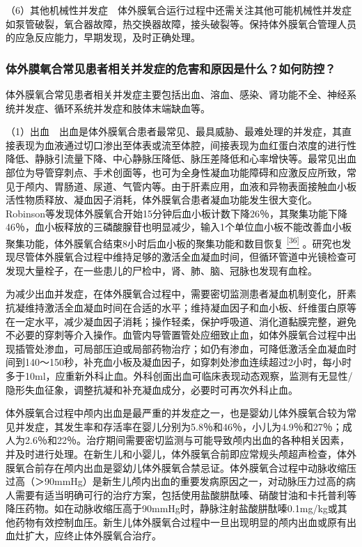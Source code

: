 （6）其他机械性并发症　体外膜氧合运行过程中还需关注其他可能机械性并发症如泵管破裂，氧合器故障，热交换器故障，接头破裂等。保持体外膜氧合管理人员的应急反应能力，早期发现，及时正确处理。

\subsubsection{体外膜氧合常见患者相关并发症的危害和原因是什么？如何防控？}

体外膜氧合常见患者相关并发症主要包括出血、溶血、感染、肾功能不全、神经系统并发症、循环系统并发症和肢体末端缺血等。

（1）出血　出血是体外膜氧合患者最常见、最具威胁、最难处理的并发症，其直接表现为血液通过切口渗出至体表或流至体腔，间接表现为血红蛋白浓度的进行性降低、静脉引流量下降、中心静脉压降低、脉压差降低和心率增快等。最常见出血部位为导管穿刺点、手术创面等，也可为全身性凝血功能障碍和应激反应所致，常见于颅内、胃肠道、尿道、气管内等。由于肝素应用，血液和异物表面接触血小板活性物质释放、凝血因子消耗，体外膜氧合患者凝血功能发生很大变化。Robinson等发现体外膜氧合开始15分钟后血小板计数下降26％，其聚集功能下降46％，血小板释放的三磷酸腺苷也明显减少，输入1个单位血小板不能改善血小板聚集功能，体外膜氧合结束8小时后血小板的聚集功能和数目恢复
\protect\hyperlink{text00030.htmlux5cux23ch36-29}{\textsuperscript{{[}36{]}}}
。研究也发现尽管体外膜氧合过程中维持足够的激活全血凝血时间，但循环管道中光镜检查可发现大量栓子，在一些患儿的尸检中，肾、肺、脑、冠脉也发现有血栓。

为减少出血并发症，在体外膜氧合过程中，需要密切监测患者凝血机制变化，肝素抗凝维持激活全血凝血时间在合适的水平；维持凝血因子和血小板、纤维蛋白原等在一定水平，减少凝血因子消耗；操作轻柔，保护呼吸道、消化道黏膜完整，避免不必要的穿刺等介入操作。血管内导管置管处应细致止血，如体外膜氧合过程中出现插管处渗血，可局部压迫或局部药物治疗；如仍有渗血，可降低激活全血凝血时间到140～150秒，补充血小板及凝血因子，如穿刺处渗血连续超过2小时，每小时多于10ml，应重新外科止血。外科创面出血可临床表现动态观察，监测有无显性/隐形失血征象，调整抗凝和补充凝血成分，必要时可再次外科止血。

体外膜氧合过程中颅内出血是最严重的并发症之一，也是婴幼儿体外膜氧合较为常见并发症，其发生率和存活率在婴儿分别为5.8％和46％，小儿为4.9％和27％；成人为2.6％和22％。治疗期间需要密切监测与可能导致颅内出血的各种相关因素，并及时进行处理。在新生儿和小婴儿，体外膜氧合前即应常规头颅超声检查，体外膜氧合前存在颅内出血是婴幼儿体外膜氧合禁忌证。体外膜氧合过程中动脉收缩压过高（＞90mmHg）是新生儿颅内出血的重要发病原因之一，对动脉压力过高的病人需要有适当明确可行的治疗方案，包括使用盐酸肼酞嗪、硝酸甘油和卡托普利等降压药物。如在动脉收缩压高于90mmHg时，静脉注射盐酸肼酞嗪0.1mg/kg或其他药物有效控制血压。新生儿体外膜氧合过程中一旦出现明显的颅内出血或原有出血灶扩大，应终止体外膜氧合治疗。

